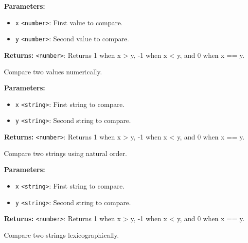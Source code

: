 \documentclass[12pt,a4paper]{article}
\begin{document}
\noindent \textbf{Parameters:}
\begin{itemize}
  \item \texttt{x} \texttt{<number>}: First value to compare.
  \item \texttt{y} \texttt{<number>}: Second value to compare.
\end{itemize}

\noindent \textbf{Returns:} \texttt{<number>}: Returns 1 when x > y, -1 when x < y, and 0 when x == y.

\noindent Compare two values numerically.

\vspace{5mm}
\noindent {}


\noindent \textbf{Parameters:}
\begin{itemize}
  \item \texttt{x} \texttt{<string>}: First string to compare.
  \item \texttt{y} \texttt{<string>}: Second string to compare.
\end{itemize}

\noindent \textbf{Returns:} \texttt{<number>}: Returns 1 when x > y, -1 when x < y, and 0 when x == y.

\noindent Compare two strings using natural order.

\vspace{5mm}
\noindent {}


\noindent \textbf{Parameters:}
\begin{itemize}
  \item \texttt{x} \texttt{<string>}: First string to compare.
  \item \texttt{y} \texttt{<string>}: Second string to compare.
\end{itemize}

\noindent \textbf{Returns:} \texttt{<number>}: Returns 1 when x > y, -1 when x < y, and 0 when x == y.

\noindent Compare two strings lexicographically.

\vspace{5mm}
\noindent {}
\end{document}
